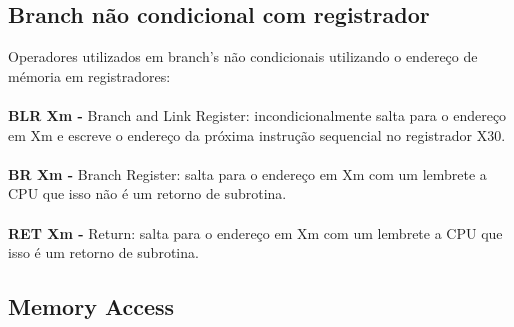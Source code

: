\documentclass[12pt,a4paper,utf8]{ppgsi}
\begin{document}
\subsection{Branch não condicional com registrador}
Operadores utilizados em branch's não condicionais utilizando o endereço de mémoria em registradores:
\\\\\textbf{BLR Xm -} Branch and Link Register: incondicionalmente salta para o endereço em Xm e escreve o endereço da próxima instrução sequencial no registrador X30.
\\\\\textbf{BR Xm -} Branch Register: salta para o endereço em Xm com um lembrete a CPU que isso não é um retorno de subrotina.
\\\\\textbf{RET {Xm} -} Return: salta para o endereço em Xm com um lembrete a CPU que isso é um retorno de subrotina.

\subsection{Memory Access}
\end{document}
